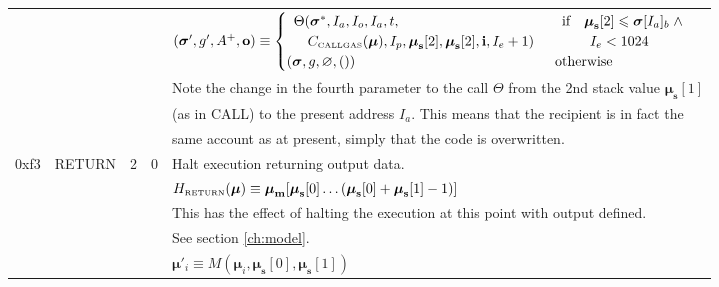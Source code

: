 \documentclass[9pt,oneside]{amsart}
\begin{document}
\begin{tabular*}{\columnwidth}[h]{rlrrl}
&&&& $(\boldsymbol{\sigma}', g', A^+, \mathbf{o}) \equiv \begin{cases}\begin{array}{l}\Theta(\boldsymbol{\sigma}^*, I_a, I_o, I_a, t,\\\quad C_{\text{\tiny CALLGAS}}(\boldsymbol{\mu}), I_p, \boldsymbol{\mu}_\mathbf{s}[2], \boldsymbol{\mu}_\mathbf{s}[2], \mathbf{i}, I_e + 1)\end{array} & \begin{array}{l}\text{if} \quad \boldsymbol{\mu}_\mathbf{s}[2] \leqslant \boldsymbol{\sigma}[I_a]_b \;\wedge\\ \quad\quad{}I_e < 1024\end{array} \\ (\boldsymbol{\sigma}, g, \varnothing, ()) & \text{otherwise} \end{cases}$ \\
&&&& Note the change in the fourth parameter to the call $\Theta$ from the 2nd stack value $\boldsymbol{\mu}_\mathbf{s}[1]$\\
&&&& (as in {\small CALL}) to the present address $I_a$. This means that the recipient is in fact the\\
&&&& same account as at present, simply that the code is overwritten.\\
\midrule
0xf3 & {\small RETURN} & 2 & 0 & Halt execution returning output data. \\
&&&& $H_{\text{\tiny RETURN}}(\boldsymbol{\mu}) \equiv \boldsymbol{\mu}_\mathbf{m}[ \boldsymbol{\mu}_\mathbf{s}[0] \dots ( \boldsymbol{\mu}_\mathbf{s}[0] + \boldsymbol{\mu}_\mathbf{s}[1] - 1 ) ]$ \\
&&&& This has the effect of halting the execution at this point with output defined.\\
&&&& See section \ref{ch:model}. \\
&&&& $\boldsymbol{\mu}'_i \equiv M(\boldsymbol{\mu}_i, \boldsymbol{\mu}_\mathbf{s}[0], \boldsymbol{\mu}_\mathbf{s}[1])$ \\
\end{tabular*}
\end{document}
